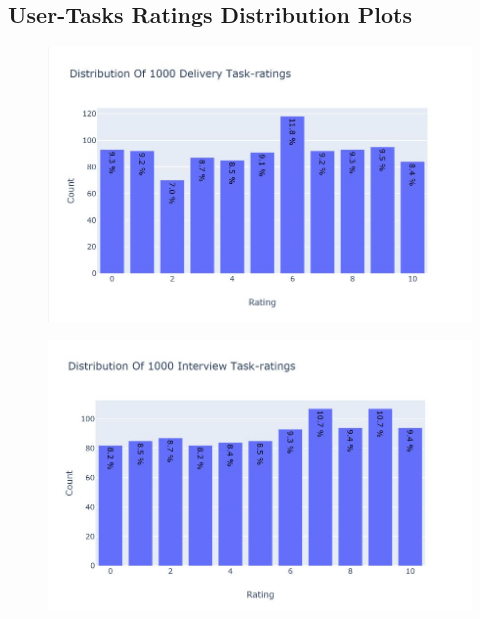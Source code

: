 \documentclass{aifyp}
\begin{document}
\begin{appendices}
\newpage
\section{User-Tasks Ratings Distribution Plots}
\begin{figure}[H]
    \centering
    \includegraphics[scale=0.5]{Images/Chapter6/DistDelivRatings.JPG}
    \label{fig:DistDeliveryRatingsBarchart}
\end{figure}
\begin{figure}[H]
    \centering
    \includegraphics[scale=0.5]{Images/Chapter6/DistIntRatings.JPG}
    \label{fig:DistIntRatingsBarchart}
\end{figure}
\begin{figure}[H]
    \centering

\end{figure}
\end{appendices}
\end{document}
